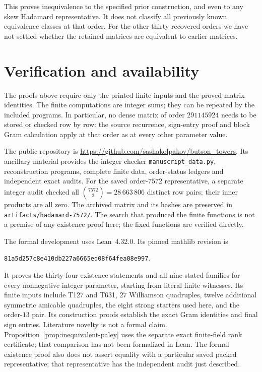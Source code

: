 \documentclass[10pt]{article}
\begin{document}
This proves inequivalence to the specified prior construction, and even
to any skew Hadamard representative. It does not classify all previously
known equivalence classes at that order. For the other thirty recovered
orders we have not settled whether the retained matrices are equivalent
to earlier matrices.

\section{Verification and availability}\label{sec:verification}

The proofs above require only the printed finite inputs and the proved
matrix identities. The finite computations are integer sums; they can
be repeated by the included programs. In particular, no dense matrix of
order $291145924$ needs to be stored or checked row by row: the source
recurrence, sign-entry proof and block Gram calculation apply at that
order as at every other parameter value.

The public repository is
\url{https://github.com/sashakolpakov/butson_towers}.
Its ancillary material provides the integer checker
\texttt{manuscript\_data.py}, reconstruction programs, complete finite
data, order-status ledgers and independent exact audits.
For the saved order-$7572$ representative, a separate integer audit
checked all $\binom{7572}{2}=28\,663\,806$ distinct row pairs; their
inner products are all zero. The archived matrix and its hashes are
preserved in \texttt{artifacts/hadamard-7572/}.
The search that produced the finite functions is not a premise of any
existence proof here; the fixed functions are verified directly.

The formal development uses Lean~4.32.0. Its pinned mathlib revision is
\begin{center}\small\texttt{81a5d257c8e410db227a6665ed08f64fea08e997}.\end{center}
It proves the thirty-four existence statements and all nine stated families for
every nonnegative integer parameter, starting from literal finite
witnesses. Its finite inputs include T127 and T631, $27$ Williamson
quadruples, twelve additional symmetric amicable quadruples, the eight
strong starters used here, and the
order-$13$ pair. Its construction proofs establish the exact Gram
identities and final sign entries. Literature novelty is not a formal
claim. Proposition~\ref{prop:inequivalent-paley} uses the separate exact
finite-field rank certificate; that comparison has not been formalized
in Lean. The formal existence proof also does not assert equality with a
particular saved packed representative; that representative has the
independent audit just described.
\end{document}
